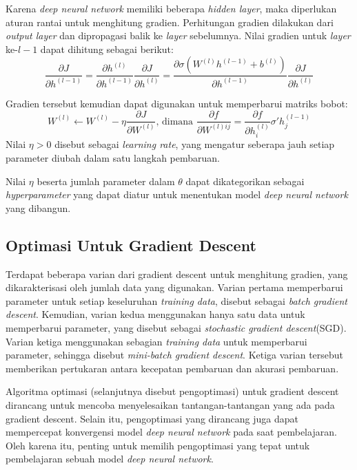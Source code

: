 Karena \emph{deep neural network} memiliki beberapa \emph{hidden layer}, maka diperlukan aturan rantai untuk menghitung gradien. Perhitungan gradien dilakukan dari \emph{output layer} dan dipropagasi balik ke \emph{layer} sebelumnya. Nilai gradien untuk \emph{layer} ke-$l-1$ dapat dihitung sebagai berikut:
\begin{equation}
\frac{\partial J}{\partial h^{(l-1)}}
= \frac{\partial h^{(l)}}{\partial h^{(l-1)}}
  \frac{\partial J}{\partial h^{(l)}}
= \frac{\partial \sigma(W^{(l)} h^{(l-1)} + b^{(l)})}{\partial h^{(l-1)}}
  \frac{\partial J}{\partial h^{(l)}}
\end{equation}

Gradien tersebut kemudian dapat digunakan untuk memperbarui matriks bobot:
\begin{equation}
W^{(l)} \leftarrow W^{(l)}
  - \eta \frac{\partial J}{\partial W^{(l)}}
  \text{, dimana }
  \frac{\partial f}{\partial W^{(l)ij}}
  = \frac{\partial f}{\partial h_i^{(l)}}\sigma'h_j^{(l-1)}
\end{equation}
Nilai $\eta > 0$ disebut sebagai \emph{learning rate}, yang mengatur seberapa jauh setiap parameter diubah dalam satu langkah pembaruan.

Nilai $\eta$ beserta jumlah parameter dalam $\theta$ dapat dikategorikan sebagai \emph{hyperparameter} yang dapat diatur untuk menentukan model \emph{deep neural network} yang dibangun.

\subsection{Optimasi Untuk Gradient Descent}
Terdapat beberapa varian dari gradient descent untuk menghitung gradien, yang dikarakterisasi oleh jumlah data yang digunakan. Varian pertama memperbarui parameter untuk setiap keseluruhan \emph{training data}, disebut sebagai \emph{batch gradient descent}. Kemudian, varian kedua menggunakan hanya satu data untuk memperbarui parameter, yang disebut sebagai \emph{stochastic gradient descent}(SGD). Varian ketiga menggunakan sebagian \emph{training data} untuk memperbarui parameter, sehingga disebut \emph{mini-batch gradient descent}. Ketiga varian tersebut memberikan pertukaran antara kecepatan pembaruan dan akurasi pembaruan.

Algoritma optimasi (selanjutnya disebut pengoptimasi) untuk gradient descent dirancang untuk mencoba menyelesaikan tantangan-tantangan yang ada pada gradient descent. Selain itu, pengoptimasi yang dirancang juga dapat mempercepat konvergensi model \emph{deep neural network} pada saat pembelajaran. Oleh karena itu, penting untuk memilih pengoptimasi yang tepat untuk pembelajaran sebuah model \emph{deep neural network}.

